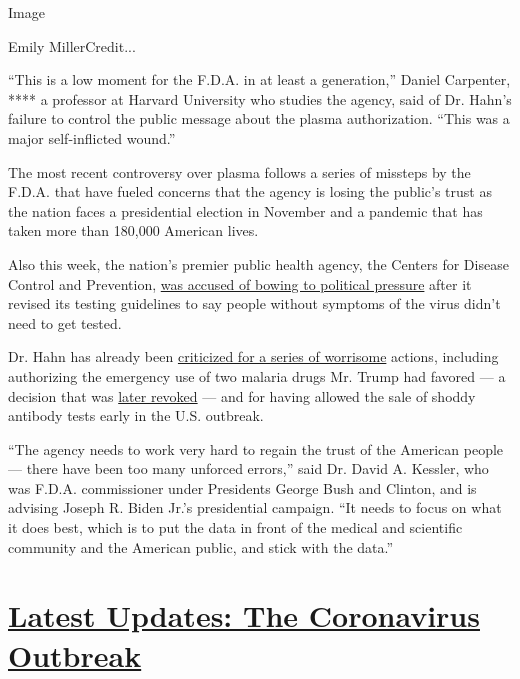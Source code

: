 Image

Emily MillerCredit...~

``This is a low moment for the F.D.A. in at least a generation,'' Daniel
Carpenter, **** a professor at Harvard University who studies the
agency, said of Dr. Hahn's failure to control the public message about
the plasma authorization. ``This was a major self-inflicted wound.''

The most recent controversy over plasma follows a series of missteps by
the F.D.A. that have fueled concerns that the agency is losing the
public's trust as the nation faces a presidential election in November
and a pandemic that has taken more than 180,000 American lives.

Also this week, the nation's premier public health agency, the Centers
for Disease Control and Prevention,
\href{https://www.nytimes3xbfgragh.onion/2020/08/27/us/politics/trump-coronavirus-testing.html}{was
accused of bowing to political pressure} after it revised its testing
guidelines to say people without symptoms of the virus didn't need to
get tested.

Dr. Hahn has already been
\href{https://www.nytimes3xbfgragh.onion/2020/08/10/health/stephen-hahn-fda.html}{criticized
for a series of worrisome} actions, including authorizing the emergency
use of two malaria drugs Mr. Trump had favored --- a decision that was
\href{https://www.fda.gov/media/138946/download}{later revoked} --- and
for having allowed the sale of shoddy antibody tests early in the U.S.
outbreak.

``The agency needs to work very hard to regain the trust of the American
people --- there have been too many unforced errors,'' said Dr. David A.
Kessler, who was F.D.A. commissioner under Presidents George Bush and
Clinton, and is advising Joseph R. Biden Jr.'s presidential campaign.
``It needs to focus on what it does best, which is to put the data in
front of the medical and scientific community and the American public,
and stick with the data.''

\hypertarget{latest-updates-the-coronavirus-outbreak}{%
\section{\texorpdfstring{\href{https://www.nytimes3xbfgragh.onion/2020/09/11/world/covid-19-coronavirus.html?action=click\&pgtype=Article\&state=default\&region=MAIN_CONTENT_1\&context=storylines_live_updates}{Latest
Updates: The Coronavirus
Outbreak}}{Latest Updates: The Coronavirus Outbreak}}\label{latest-updates-the-coronavirus-outbreak}}

